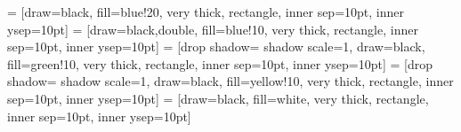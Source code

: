 
 
\usepackage[english]{babel} 
\usepackage{blindtext} 
 = [draw=black, fill=blue!20, very thick,
    rectangle, inner sep=10pt, inner ysep=10pt]
 = [draw=black,double, fill=blue!10, very thick,
    rectangle, inner sep=10pt, inner ysep=10pt]
 = [drop shadow={
    shadow scale=1}, draw=black, fill=green!10, very thick,
    rectangle, inner sep=10pt, inner ysep=10pt]
 = [drop shadow={
    shadow scale=1}, draw=black, fill=yellow!10, very thick,
    rectangle, inner sep=10pt, inner ysep=10pt]
 = [draw=black, fill=white, very thick,
    rectangle, inner sep=10pt, inner ysep=10pt]
